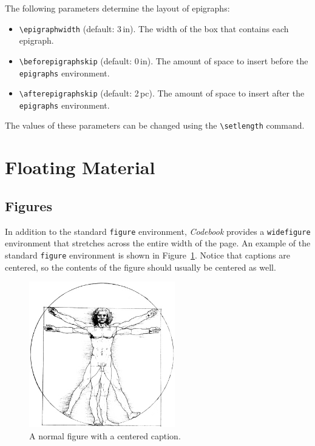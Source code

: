 \documentclass[minted]{codebook}
\begin{document}
The following parameters determine the layout of epigraphs:
\begin{itemize}
  \item \verb|\epigraphwidth| (default: 3\,in). The width of the box that contains each epigraph.

  \item \verb|\beforepigraphskip| (default: 0\,in). The amount of space to insert before the \verb|epigraphs| environment.

  \item \verb|\afterepigraphskip| (default: 2\,pc). The amount of space to insert after the \verb|epigraphs| environment.
\end{itemize}
The values of these parameters can be changed using the \verb|\setlength| command.

\section{Floating Material}

\subsection{Figures}

In addition to the standard \texttt{figure} environment, \emph{Codebook} provides a \texttt{widefigure} environment that stretches across the entire width of the page.
An example of the standard \texttt{figure} environment is shown in Figure~\ref{fig:normal}.
Notice that captions are centered, so the contents of the figure should usually be centered as well.

\begin{figure}
  \includegraphics[width=2.5in]{vitruvian}
  \caption{A normal figure with a centered caption.}
  \label{fig:normal}
\end{figure}
\end{document}
